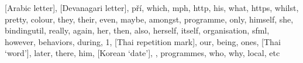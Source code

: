[Arabic letter], [Devanagari letter], pří, which, mph, http, his, what, https, whilst, pretty, colour, they, their, even, maybe, amongst, programme, only, himself, she, bindingutil, really, again, her, then, also, herself, itself, organisation, sfml, however, behaviors, during, 1, [Thai repetition mark], our, being, ones, [Thai `word'], later, there, him, [Korean `date'], , programmes, who, why, local, etc
